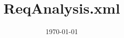 \documentclass[11pt,a4paper]{article}
\begin{document}
\title{ReqAnalysis.xml}
\date{\today}
\maketitle


\end{document}
